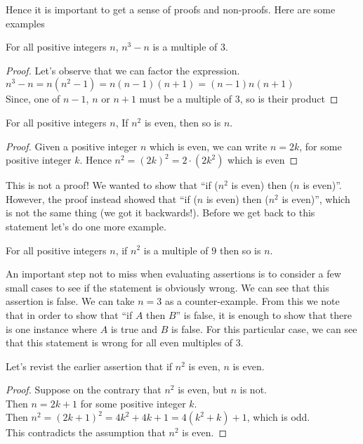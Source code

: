 \documentclass{article}
\begin{document}
Hence it is important to get a sense of proofs and non-proofs. Here are some examples
\begin{assert}
    For all positive integers $n$, $n^3 - n$ is a multiple of $3$.
\end{assert}

\begin{proof}
    Let's observe that we can factor the expression. \\[10pt]
    $n^3 - n = n(n^2 - 1) = n(n-1)(n+1) = (n-1)n(n+1)$ \\[10pt]
    Since, one of $n-1$, $n$ or $n+1$ must be a multiple of $3$, so is their product
\end{proof}

\begin{assert}
    For all positive integers $n$, If $n^2$ is even, then so is $n$.
\end{assert}

\begin{proof}
    Given a positive integer $n$ which is even, we can write $n = 2k$, for some positive integer $k$. Hence $n^2 = (2k)^2 = 2 \cdot (2k^2)$ which is even
\end{proof}

This is not a proof! We wanted to show that ``if ($n^2$ is even) then ($n$ is even)''. However, the proof instead showed that ``if ($n$ is even) then ($n^2$ is even)'', which is not the same thing (we got it backwards!). Before we get back to this statement let's do one more example.

\begin{assert}
    For all positive integers $n$, if $n^2$ is a multiple of $9$ then so is $n$.
\end{assert}

An important step not to miss when evaluating assertions is to consider a few small cases to see if the statement is obviously wrong. We can see that this assertion is false. We can take $n = 3$ as a counter-example. From this we note that in order to show that ``if $A$ then $B$'' is false, it is enough to show that there is one instance where $A$ is true and $B$ is false. For this particular case, we can see that this statement is wrong for all even multiples of $3$.

Let's revist the earlier assertion that if $n^2$ is even, $n$ is even.

\begin{proof}
    Suppose on the contrary that $n^2$ is even, but $n$ is not.\\
    Then $n = 2k+1$ for some positive integer $k$.\\
    Then $n^2 = (2k +1)^2 = 4k^2 + 4k + 1 = 4(k^2 + k) + 1$, which is odd.\\
    This contradicts the assumption that $n^2$ is even. \contradiction
\end{proof}
\end{document}
